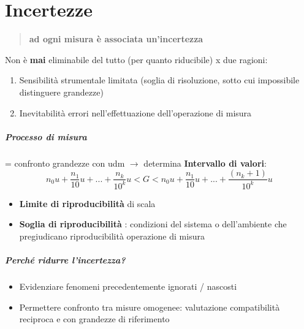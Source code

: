 \documentclass[10pt, oneside]{book}
\begin{document}
\chapter{Incertezze}
\begin{quote}
\textbf{ad ogni misura è associata un'incertezza}
\end{quote}
Non è \textbf{mai} eliminabile del tutto (per quanto riducibile) x due ragioni:
\begin{enumerate}
\item Sensibilità strumentale limitata (soglia di risoluzione, sotto cui impossibile distinguere grandezze)
\item Inevitabilità errori nell'effettuazione dell'operazione di misura
\end{enumerate}
\paragraph{Processo di misura} = confronto grandezze con udm $\rightarrow$ determina \textbf{Intervallo di valori}:
\[n_0 u + \frac{n_1}{10} u + ... + \frac{n_k}{10^k} u < G < n_0 u + \frac{n_1}{10} u + ... + \frac{(n_k+1)}{10^k} u\]
\begin{itemize}
\item \textbf{Limite di riproducibilità} di scala
\item \textbf{Soglia di riproducibilità} : condizioni del sistema o dell'ambiente che pregiudicano riproducibilità operazione di misura
\end{itemize}
\paragraph{Perché ridurre l'incertezza?}
\begin{itemize}
\item Evidenziare fenomeni precedentemente ignorati / nascosti
\item Permettere confronto tra misure omogenee: valutazione compatibilità reciproca e con grandezze di riferimento
\end{itemize}
\end{document}
